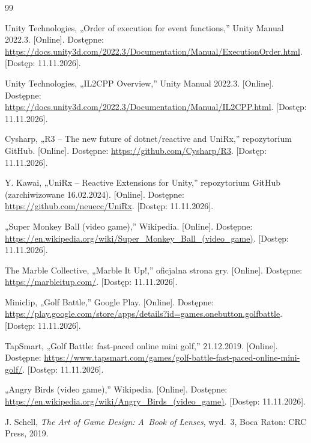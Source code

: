 \newcommand{\dostep}{[Dostęp: 11.11.2026]}

\begingroup
\small
{}
\begin{thebibliography}{99}
{}
\setlength{\itemsep}{2pt}

 Unity Technologies, „Order of execution for event functions,” Unity
  Manual 2022.3. [Online]. Dostępne:
  \url{https://docs.unity3d.com/2022.3/Documentation/Manual/ExecutionOrder.html}. \dostep.

 Unity Technologies, „IL2CPP Overview,” Unity Manual 2022.3.
  [Online]. Dostępne: \url{https://docs.unity3d.com/2022.3/Documentation/Manual/IL2CPP.html}.
  \dostep.

 Cysharp, „R3 -- The new future of dotnet/reactive and UniRx,” repozytorium
  GitHub. [Online]. Dostępne: \url{https://github.com/Cysharp/R3}. \dostep.

 Y. Kawai, „UniRx -- Reactive Extensions for Unity,” repozytorium GitHub
  (zarchiwizowane 16.02.2024). [Online]. Dostępne: \url{https://github.com/neuecc/UniRx}.
  \dostep.

 „Super Monkey Ball (video game),” Wikipedia. [Online]. Dostępne:
  \url{https://en.wikipedia.org/wiki/Super_Monkey_Ball_(video_game)}. \dostep.

 The Marble Collective, „Marble It Up!,” oficjalna strona gry. [Online].
  Dostępne: \url{https://marbleitup.com/}. \dostep.

 Miniclip, „Golf Battle,” Google Play. [Online]. Dostępne:
  \url{https://play.google.com/store/apps/details?id=games.onebutton.golfbattle}. \dostep.

 TapSmart, „Golf Battle: fast-paced online mini golf,”
  21.12.2019. [Online]. Dostępne:
  \url{https://www.tapsmart.com/games/golf-battle-fast-paced-online-mini-golf/}. \dostep.

 „Angry Birds (video game),” Wikipedia. [Online]. Dostępne:
  \url{https://en.wikipedia.org/wiki/Angry_Birds_(video_game)}. \dostep.

 J. Schell, \emph{The Art of Game Design: A~Book of Lenses}, wyd.~3,
  Boca Raton: CRC Press, 2019.


\end{thebibliography}
